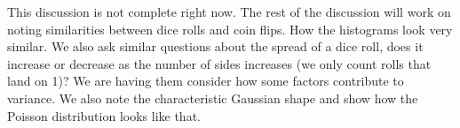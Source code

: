\documentclass[11pt]{article}
\begin{document}
\begin{enumerate}
This discussion is not complete right now. The rest of the discussion will work on noting similarities between dice rolls and coin flips. How the histograms look very similar. We also ask similar questions about the spread of a dice roll, does it increase or decrease as the number of sides increases (we only count rolls that land on 1)? We are having them consider how some factors contribute to variance. We also note the characteristic Gaussian shape and show how the Poisson distribution looks like that. 



   
 \end{enumerate}
\end{document}
